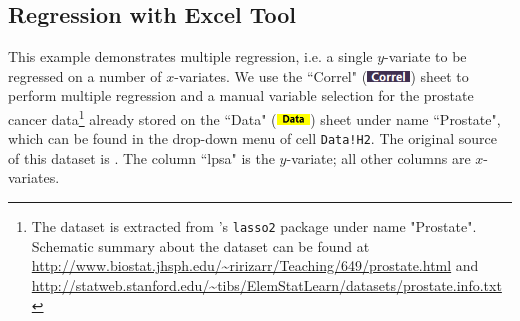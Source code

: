 \documentclass[article]{jss}
\newcommand{\shtData}{``Data" (\includegraphics[height=8pt, keepaspectratio=true]{DataSheetTab_png}) }
\newcommand{\shtCorrel}{``Correl" (\includegraphics[height=8pt, keepaspectratio=true]{CorrelSheetTab_png}) }
\begin{document}
        \subsection[egReg]{Regression with Excel Tool}
        This example demonstrates multiple regression, i.e. a single $y$-variate to be regressed on a number of $x$-variates. We use the \shtCorrel sheet to perform multiple regression and a manual variable selection for the prostate cancer data\footnote{The dataset is extracted from 's \texttt{lasso2} package under name "Prostate". Schematic summary about the dataset can be found at \url{http://www.biostat.jhsph.edu/~ririzarr/Teaching/649/prostate.html} and \url{http://statweb.stanford.edu/~tibs/ElemStatLearn/datasets/prostate.info.txt}} already stored on the \shtData sheet under name ``Prostate", which can be found in the drop-down menu of cell \texttt{Data!H2}. The original source of this dataset is \cite{stamey1989prostate}. The column ``lpsa" is the $y$-variate; all other columns are $x$-variates.
\end{document}
